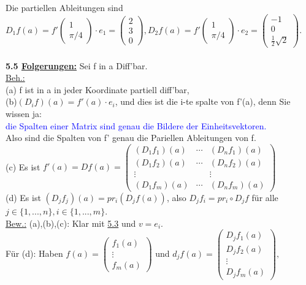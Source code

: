 \documentclass[]{scrartcl}
\begin{document}
	Die partiellen Ableitungen sind $D_1 f(a)=f'\begin{pmatrix}
		1\\\pi/4
	\end{pmatrix}\cdot e_1=\begin{pmatrix}
		2\\3\\0
	\end{pmatrix}, D_2f(a)=f'\begin{pmatrix}
		1\\\pi/4
	\end{pmatrix}\cdot e_2 =\begin{pmatrix}
		-1\\0\\\frac{1}{2}\sqrt{2}
	\end{pmatrix}.$\\
	\\
	\textbf{5.5 \underline{Folgerungen:}} Sei f in a Diff'bar.\\
	\underline{Beh.:}\\
	(a) f ist in a in jeder Koordinate partiell diff'bar,\\
	(b)\ul{$(D_if)(a)=f'(a)\cdot e_i$}, und dies ist die i-te spalte von f'(a), denn Sie wissen ja:\\
	\textcolor{blue}{die Spalten einer Matrix sind genau die Bildere der Einheitsvektoren.}\\
	Also sind die Spalten von f' genau die Pariellen Ableitungen von f.\\
	(c) Es ist $f'(a)=Df(a)=\begin{pmatrix}
		(D_1f_1)(a)& \cdots & (D_nf_1)(a)\\
		(D_1f_2)(a)& \cdots & (D_nf_2)(a)\\
		\vdots& & \vdots\\
		(D_1f_m)(a)&\cdots & (D_nf_m)(a)
	\end{pmatrix}$\\
	(d) Es ist \ul{$(D_jf_j)(a)=pr_i(D_jf(a))$}, also $D_jf_i=pr_i\circ D_jf$ für alle $j\in \{1,...,n\}, i\in \{1,...,m\}$.\\
	\underline{Bew.:} (a),(b),(c): Klar mit \ul{5.3} und $v=e_i$.\\
	Für (d): Haben $f(a)=\begin{pmatrix}
		f_1(a)\\\vdots\\f_m(a)
	\end{pmatrix}$ und $d_jf(a)=\begin{pmatrix}
		D_jf_1(a)\\D_jf_2(a)\\\vdots\\D_jf_m(a)
	\end{pmatrix},$\\
\end{document}
